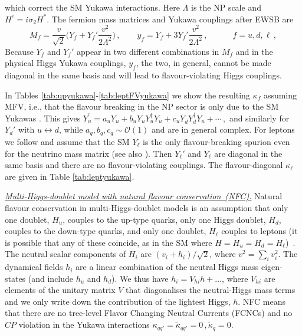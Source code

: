 \documentclass[../report.tex]{subfiles}
\begin{document}
which correct the SM Yukawa interactions. 
        Here $\Lambda$ is the NP scale and $H^c =
i\sigma_2H^\ast$. The fermion mass matrices and
Yukawa couplings after EWSB are 
\begin{equation}
M_f=\frac{v}{\sqrt2}\Big(Y_f +Y_f' \frac{v^2}{2 \Lambda^2}\Big)\,,
\qquad y_f=Y_f +3 Y_f' \frac{v^2}{2 \Lambda^2}\,, \qquad \quad f=u,d, \ell\,, 
\end{equation}
Because $Y_f$ and $Y_{f}'$ appear in two different combinations in
$M_f$ and in the physical Higgs Yukawa couplings, $y_f$, the two, in general, cannot be made diagonal in the
same basis and will lead to flavour-violating Higgs couplings.

In Tables \ref{tab:upyukawa}-\ref{tab:leptFVyukawa} we show the resulting $\kappa_f$ assuming MFV, i.e.,  that the flavour breaking in the NP sector is only due to the SM
Yukawas \cite{D'Ambrosio:2002ex, Chivukula:1987py,
  Gabrielli:1994ff, Ali:1999we, Buras:2000dm, Buras:2003jf,
  Kagan:2009bn}. This gives  $Y_u^{\prime}= a_uY_u +
        b^{\phantom\dagger}_uY^{\phantom\dagger}_uY_u^\dagger
        Y^{\phantom\dagger}_u + c^{\phantom\dagger}_u
        Y^{\phantom\dagger}_dY_d^\dagger
        Y^{\phantom\dagger}_u+\cdots\,,$ and similarly for $Y_d'$ with $u\leftrightarrow d$, while
        $a_q, b_q, c_q\sim {\mathcal O}(1)$ and are in general complex. For leptons we follow \cite{Dery:2013rta} and assume that the SM $Y_{\ell}$ is the only flavour-breaking spurion even for the neutrino mass matrix (see also \cite{Cirigliano:2005ck}). Then $Y_\ell'$ and $Y_{\ell}$ are diagonal in the same basis and there are no flavour-violating couplings. The flavour-diagonal $\kappa_\ell$ are given in Table \ref{tab:leptyukawa}.
        

\underline{\it Multi-Higgs-doublet model with natural flavour conservation~(NFC).}
Natural flavour conservation in multi-Higgs-doublet models is an assumption that only one doublet, $H_u$, couples to the up-type quarks, only one Higgs doublet, $H_d$, couples to the down-type quarks, and only one doublet, $H_\ell$ couples to leptons (it is possible that any of these coincide, as in the SM where $H=H_u=H_d=H_\ell$)~\cite{Glashow:1976nt, Paschos:1976ay}. The neutral scalar components of $H_i$ are $(v_i+h_i)/\sqrt2$, where
$v^2=\sum_i v_i^2$. The dynamical fields $h_{i}$ are a linear combination of the neutral
Higgs mass eigen-states (and include $h_u$ and $h_d$). We thus have
$h_i=V_{hi} h + \ldots$, where $V_{hi}$ are elements of the unitary
matrix $V$ that diagonalises the neutral-Higgs mass terms and we only
write down the contribution of the lightest Higgs, $h$. NFC means that there are no tree-level Flavor Changing Neutral Currents (FCNCs) and no $CP$
violation in the Yukawa interactions $\kappa_{qq'}=\tilde \kappa_{qq'}=0\,, \tilde \kappa_q=0$. 
\end{document}
